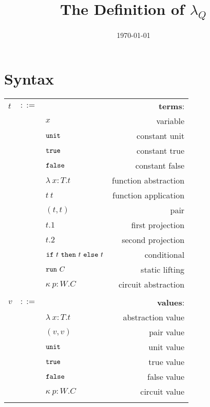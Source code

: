 \documentclass[12pt]{article}
\title{The Definition of $\lambda_Q$}
\author{}
\date{\today}
\begin{document}
\maketitle
\tableofcontents



\section{Syntax}

\begin{longtable}[c]{lclr}
  \label{tab:table1}\\
  \toprule
  $t$ &$::=$ &  &\textbf{terms}: \\
      & &$x$ &variable\\
      & &$\mathtt{unit}$ &constant unit\\
      & &$\mathtt{true}$ &constant true\\
      & &$\mathtt{false}$ &constant false\\
      & &$\lambda\ x:T.t$ &function abstraction\\
      & &$t\ t$ &function application\\
      & &$(t, t)$ &pair\\
      & &$t.1$ &first projection\\
      & &$t.2$ &second projection\\
      & &$\tif\ t\ \tthen\ t\ \telse\ t$ &conditional\\
      & &$\trun\ C$ &static lifting\\
      & &$\kappa \ p:W . C$ &circuit abstraction\\
  \\
  
  $v$ &$::=$ &  &\textbf{values}: \\
      & &$\lambda\ x:T.t$ &abstraction value\\
      & &$(v, v)$ &pair value\\
      & &$\mathtt{unit}$ &unit value\\
      & &$\mathtt{true}$ &true value\\
      & &$\mathtt{false}$ &false value\\
      & &$\kappa\ p:W . C$ &circuit value\\
  \\


\end{longtable}
\end{document}
